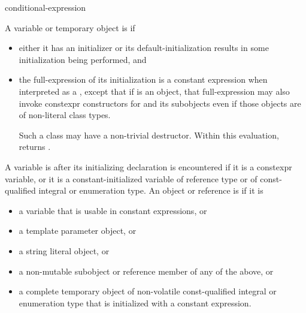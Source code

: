 \begin{bnf}
\br
    conditional-expression
\end{bnf}

\pnum
A variable or temporary object  is  if
\begin{itemize}
\item
  either it has an initializer or
  its default-initialization results in some initialization being performed, and
\item
  the full-expression of its initialization is a constant expression
  when interpreted as a ,
  except that if  is an object,
  that full-expression
  may also invoke constexpr constructors
  for  and its subobjects
  even if those objects are of non-literal class types.
  \begin{note}
  Such a class may have a non-trivial destructor.
  Within this evaluation,
  returns .
\end{note}
\end{itemize}

\pnum
A variable is  after
its initializing declaration is encountered if it is a constexpr variable, or
it is a constant-initialized variable
of reference type or of const-qualified integral or enumeration type.
An object or reference is  if it is
\begin{itemize}
\item a variable that is usable in constant expressions, or
\item a template parameter object, or
\item a string literal object, or
\item a non-mutable subobject or reference member of any of the above, or
\item a complete temporary object of
  non-volatile const-qualified integral or enumeration type
  that is initialized with a constant expression.
\end{itemize}

